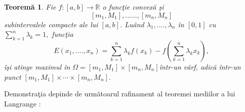\documentclass[a4paper,12pt,oneside]{report}
\newtheorem{theorem}{Teorem\u a}
\begin{document}
\begin{theorem}
Fie \(f : \left [ a,b \right ] \rightarrow \mathbb{R}\) o func\c{t}ie convex\u{a} \c{s}i 
\begin{displaymath}
   \left [ m_{1}, M_{1} \right ],......,\left [ m_{n}, M_{n} \right ]
\end{displaymath}
subintervalele compacte ale lui \(\left [ a,b \right ]\). Lu\^{a}nd \(\lambda _{1}, ....,\lambda _{n}\) \^{i}n \(\left [ 0,1 \right ]\) cu \(\sum_{k = 1}^{n}\lambda _{k} = 1,\) func\c{t}ia 
\begin{displaymath}
   E \left ( x_{1},....,x_{n} \right ) = \sum_{k = 1}^{n}\lambda _{k}f\left ( x_{k} \right ) - f\left ( \sum_{k=1}^{n}\lambda _{k}x_{k} \right ), 
\end{displaymath}
\^{i}\c{s}i atinge maximul \^{i}n \(\Omega = \left [ m_{1}, M_{1} \right ] \times  \left [ m_{n}, M_{n} \right ] \)\^{i}ntr-un v\^{a}rf, adic\u{a} \^{i}ntr-un punct \(\left [ m_{1}, M_{1} \right ] \times\cdots \times   \left [ m_{n}, M_{n} \right ].\) 
\end{theorem}
Demonstra\c{t}ia depinde de urm\u{a}toarul rafinament al teoremei mediilor a lui Langrange :
\end{document}
